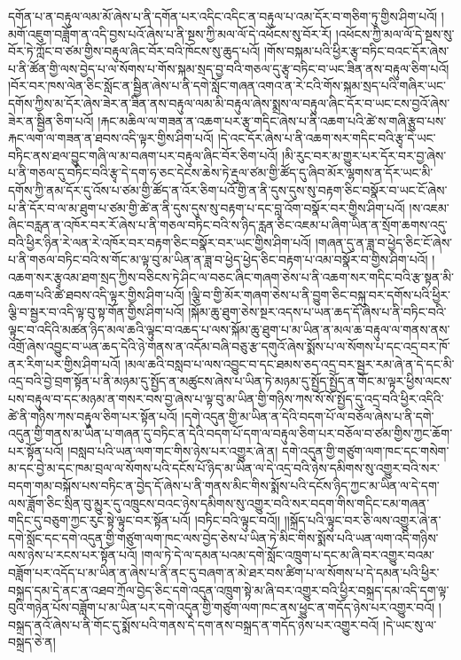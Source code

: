 དགོན་པ་ན་བརྟུལ་ལམ་མོ་ཞེས་པ་ནི་དགོན་པར་འདིང་འདིང་ན་བརྟུལ་པ་འམ་དོར་བ་གཅིག་ཏུ་གྱིས་ཤིག་པའོ། །མགོ་འཇུག་བཟློག་ན་འདི་བྱས་པའོ་ཞེས་པ་ནི་སྔས་ཀྱི་མལ་ལོ་དེ་འཕོངས་སུ་བོར་རོ། །འཕོངས་ཀྱི་མལ་ལོ་དེ་སྔས་སུ་བོར་ཏེ་ཀློང་བ་ཙམ་གྱིས་བརྟུལ་ཞིང་བོར་བའི་ཁོངས་སུ་ཆུད་པའོ། །གོས་བསྐམ་པའི་ཕྱིར་རྩྭ་བཏིང་བའང་དོར་ཞེས་པ་ནི་ཚོན་གྱི་ལས་བྱེད་པ་ལ་སོགས་པ་གོས་སྐམ་སྲད་བྱ་བའི་གཅལ་དུ་རྩྭ་བཏིང་བ་ཡང་ཟིན་ནས་བརྟུལ་ཅིག་པའོ། །བོར་བར་ཁས་ལེན་ཅིང་སློང་ན་སྦྱིན་ཞེས་པ་ནི་དགེ་སློང་གཞན་འགའ་ན་རེ་ངའི་གོས་སྐམ་སྲད་པའི་གཞིར་ཡང་དགོས་ཀྱིས་མ་དོར་ཞེས་ཟེར་ན་ཟིན་ནས་བརྟུལ་ལམ་མི་བརྟུལ་ཞེས་སྨྲས་ལ་བརྟུལ་ཞིང་དོར་བ་ཡང་ངས་བྱའོ་ཞེས་ཟེར་ན་སྦྱིན་ཅིག་པའོ། །རྐང་མཆིལ་ལ་གཟན་ན་འཆག་པར་རྩྭ་གདིང་ཞེས་པ་ནི་འཆག་པའི་ཚེ་ས་གཞི་རྩུབ་པས་རྐང་ལག་ལ་གཟན་ན་ཐབས་འདི་ལྟར་གྱིས་ཤིག་པའོ། །དེ་འང་དོར་ཞེས་པ་ནི་འཆག་སར་གདིང་བའི་རྩྭ་དེ་ཡང་བཏིང་ནས་ཐལ་བྱུང་གཞི་ལ་མ་བཞག་པར་བརྟུལ་ཞིང་བོར་ཅིག་པའོ། །མི་རུང་བར་མ་གྱུར་པར་དོར་བར་བྱ་ཞེས་པ་ནི་གཅལ་དུ་བཏིང་བའི་རྩྭ་དེ་དག་ཧ་ཅང་དེངས་ཆེས་ཏེ་རྡུལ་ཙམ་གྱི་ཚོད་དུ་ཞིབ་མོར་ལྷགས་ན་དོར་ཡང་མི་དགོས་ཀྱི་ནམ་དོར་དུ་འོས་པ་ཙམ་གྱི་ཚོད་ན་འོར་ཅིག་པའོ་གྱི་ན་ནི་དུས་དུས་སུ་བརྟག་ཅིང་བསྣོར་བ་ཡང་ངོ་ཞེས་པ་ནི་དོར་བ་ལ་མ་ཐུག་པ་ཙམ་གྱི་ཚེ་ན་ནི་དུས་དུས་སུ་བརྟག་པ་དང་བླ་འོག་བསྣོར་བར་གྱིས་ཤིག་པའོ། །ས་འཇམ་ཞིང་བརླན་ན་འཁོར་བར་རོ་ཞེས་པ་ནི་གཅལ་བཏིང་བའི་ས་ཉིད་རླན་ཅིང་འཇམ་པ་ཞིག་ཡིན་ན་སྲོག་ཆགས་འདུ་བའི་ཕྱིར་ཉིན་རེ་ལན་རེ་འཁོར་བར་བརྟག་ཅིང་བསྣོར་བར་ཡང་གྱིས་ཤིག་པའོ། །གཞན་དུ་ན་ཟླ་བ་ཕྱེད་ཅིང་ངོ་ཞེས་པ་ནི་གཅལ་བཏིང་བའི་ས་གོང་མ་ལྟ་བུ་མ་ཡིན་ན་ཟླ་བ་ཕྱེད་ཕྱེད་ཅིང་བརྟག་པ་འམ་བསྣོར་བ་གྱིས་ཤིག་པའོ། །འཆག་སར་རྩྭའམ་ཐག་སྲད་ཀྱིས་བཅིངས་ཏེ་ཤིང་ལ་བཅང་ཞིང་གཞག་ཅེས་པ་ནི་འཆག་སར་གདིང་བའི་རྩ་སྟན་མི་འཆག་པའི་ཚེ་ཐབས་འདི་ལྟར་གྱིས་ཤིག་པའོ། །ལྕི་བ་གྱི་མོར་གཞག་ཅེས་པ་ནི་བྱུག་ཅིང་བསྐུ་བར་དགོས་པའི་ཕྱིར་ལྕི་བ་སྦྱར་བ་འདི་ལྟ་བུ་སྟ་གོན་གྱིས་ཤིག་པའོ། །སྐོམ་ཆུ་ཐུག་ཅེས་སྔར་འདས་པ་ཡན་ཆད་དོ་ཞེས་པ་ནི་བཏིང་བའི་ལྟུང་བ་འདིའི་མཚན་ཉིད་མལ་ཆའི་ལྟུང་བ་འཆད་པ་ལས་སྐོམ་ཆུ་ཐུག་པ་མ་ཡིན་ན་མལ་ཆ་བརྟུལ་ལ་གནས་ནས་འགྲོ་ཞེས་འབྱུང་བ་ཡན་ཆད་དེའི་ཉེ་གནས་ན་འདོམ་བཞི་བཅུ་རྩ་དགུའོ་ཞེས་སྨོས་པ་ལ་སོགས་པ་དང་འདྲ་བར་ཁོ་ནར་རིག་པར་གྱིས་ཤིག་པའོ། །མལ་ཆའི་བསླབ་པ་ལས་འབྱུང་བ་དང་ཐམས་ཅད་འདྲ་བར་སྦྱར་རམ་ཞེ་ན་དེ་དང་མི་འདྲ་བའི་བྱེ་བྲག་སྟོན་པ་ནི་མཉམ་དུ་སྤྱོད་ན་མཚུངས་ཞེས་པ་ཡིན་ཏེ་མཉམ་དུ་སྤྱོད་སྤྱོད་ན་གོང་མ་ལྟར་ཕྱིས་ལངས་པས་བརྟུལ་བ་དང་མཉམ་ན་གསར་བས་བྱ་ཞེས་པ་ལྟ་བུ་མ་ཡིན་གྱི་གཉིས་ཀས་སོ་སོ་སྤྱོད་དུ་འདྲ་བའི་ཕྱིར་འདིའི་ཚེ་ནི་གཉིས་ཀས་བརྟུལ་ཅིག་པར་སྟོན་པའོ། །དགེ་འདུན་གྱི་མ་ཡིན་ན་དེའི་བདག་པོ་ལ་བཅོལ་ཞེས་པ་ནི་དགེ་འདུན་གྱི་གནས་མ་ཡིན་པ་གཞན་དུ་བཏིང་ན་དེའི་བདག་པོ་དག་ལ་བརྟུལ་ཅིག་པར་བཅོལ་བ་ཙམ་གྱིས་ཀྱང་ཆོག་པར་སྟོན་པའོ། །བསླབ་པའི་ཡན་ལག་གང་གིས་ཉེས་པར་འགྱུར་ཞེ་ན། དགེ་འདུན་གྱི་གཙུག་ལག་ཁང་དང་གསེག་མ་དང་བྱེ་མ་དང་ཁམ་བྲལ་ལ་སོགས་པའི་དངོས་པོ་ཉིད་མ་ཡིན་ལ་དེ་འདྲ་བའི་ཉེས་དམིགས་སུ་འགྱུར་བའི་སར་བདག་གམ་བསྐོས་པས་བཏིང་ན་བྱེད་དོ་ཞེས་པ་ནི་གནས་མིང་གིས་སྨོས་པའི་དངོས་ཉིད་ཀྱང་མ་ཡིན་ལ་དེ་དག་ལས་ཟློག་ཅིང་སྲིན་བུ་མྱུར་དུ་འཁྲུངས་བའང་ཉེས་དམིགས་སུ་འགྱུར་བའི་སར་བདག་གིས་གདིང་ངམ་གཞན་གདིང་དུ་བཅུག་ཀྱང་རུང་སྟེ་ལྟུང་བར་སྟོན་པའོ། །བཏིང་བའི་ལྟུང་བའོ།། །།སྐྲོད་པའི་ལྟུང་བར་ཅི་ལས་འགྱུར་ཞེ་ན་དགེ་སློང་དང་དགེ་འདུན་གྱི་གཙུག་ལག་ཁང་ལས་བྱེད་ཅེས་པ་ཡིན་ཏེ་མིང་གིས་སྨོས་པའི་ཡན་ལག་འདི་གཉིས་ལས་ཉེས་པ་རངས་པར་སྟོན་པའོ། །གལ་ཏེ་དེ་ལ་དམན་པའམ་དགེ་སློང་འཁྲུག་པ་དང་མ་ཞི་བར་འགྱུར་བའམ་བཟློག་པར་འདོད་པ་མ་ཡིན་ན་ཞེས་པ་ནི་ནང་དུ་བཞག་ན་མེ་ཐར་བས་ཚིག་པ་ལ་སོགས་པ་དེ་དམན་པའི་ཕྱིར་བསྐྲད་དམ་དེ་ནང་ན་འཐབ་ཀྲོལ་བྱེད་ཅིང་དགེ་འདུན་འཁྲུག་སྟེ་མ་ཞི་བར་འགྱུར་བའི་ཕྱིར་བསྐྲད་དམ་འདི་དག་ལྟ་བུའི་གཉེན་པོས་བཟློག་པ་མ་ཡིན་པར་དགེ་འདུན་གྱི་གཙུག་ལག་ཁང་ནས་ཕྱུང་ན་གདོད་ཉེས་པར་འགྱུར་བའོ། །བསྐྲད་ནའོ་ཞེས་པ་ནི་གོང་དུ་སྨོས་པའི་གནས་དེ་དག་ནས་བསྐྲད་ན་གདོད་ཉེས་པར་འགྱུར་བའོ། །དེ་ཡང་སུ་ལ་བསྐྲད་ཅེ་ན། 